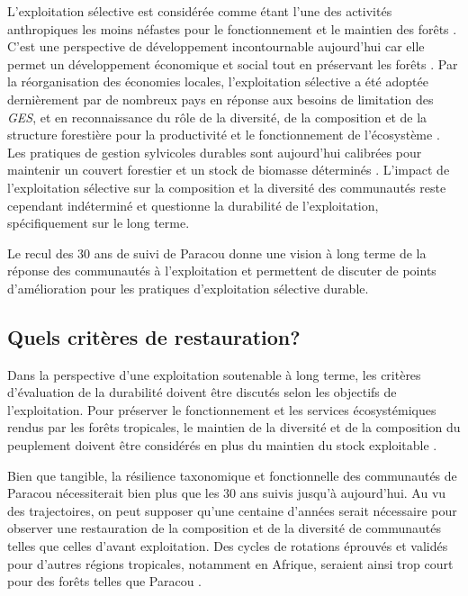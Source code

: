 \documentclass[
  11pt,
  french,
  A4paper,
  extrafontsizes,onecolumn,openright
  ]{memoir}
\begin{document}
L'exploitation sélective est considérée comme étant l'une des activités
anthropiques les moins néfastes pour le fonctionnement et le maintien
des forêts \autocite{Edwards2014}. C'est une perspective de
développement incontournable aujourd'hui car elle permet un
développement économique et social tout en préservant les forêts
\autocite{Chaudhary2016}. Par la réorganisation des économies locales,
l'exploitation sélective a été adoptée dernièrement par de nombreux pays
en réponse aux besoins de limitation des \emph{GES}, et en
reconnaissance du rôle de la diversité, de la composition et de la
structure forestière pour la productivité et le fonctionnement de
l'écosystème \autocite{Begon2006}. Les pratiques de gestion sylvicoles
durables sont aujourd'hui calibrées pour maintenir un couvert forestier
et un stock de biomasse déterminés \autocite{ITTO2005}. L'impact de
l'exploitation sélective sur la composition et la diversité des
communautés reste cependant indéterminé et questionne la durabilité de
l'exploitation, spécifiquement sur le long terme.

Le recul des 30 ans de suivi de Paracou donne une vision à long terme de
la réponse des communautés à l'exploitation et permettent de discuter de
points d'amélioration pour les pratiques d'exploitation sélective
durable.

\subsection{Quels critères de
restauration?}\label{quels-criteres-de-restauration}

Dans la perspective d'une exploitation soutenable à long terme, les
critères d'évaluation de la durabilité doivent être discutés selon les
objectifs de l'exploitation. Pour préserver le fonctionnement et les
services écosystémiques rendus par les forêts tropicales, le maintien de
la diversité et de la composition du peuplement doivent être considérés
en plus du maintien du stock exploitable
\autocites{ITTO2005}{Barlow2018}.

Bien que tangible, la résilience taxonomique et fonctionnelle des
communautés de Paracou nécessiterait bien plus que les 30 ans suivis
jusqu'à aujourd'hui. Au vu des trajectoires, on peut supposer qu'une
centaine d'années serait nécessaire pour observer une restauration de la
composition et de la diversité de communautés telles que celles d'avant
exploitation. Des cycles de rotations éprouvés et validés pour d'autres
régions tropicales, notamment en Afrique, seraient ainsi trop court pour
des forêts telles que Paracou \autocite{Durrieu1998}.
\end{document}
